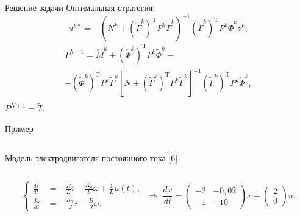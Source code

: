         \begin{frame}{Решение задачи}
                Оптимальная стратегия:
                $$
                        \boxed{
                                u^{k*} = -(N^k + (\tilde\Gamma^k)^{\mathrm{T}} P^{k}\tilde\Gamma^k)^{-1}(\tilde\Gamma^k)^{\mathrm{T}} P^{k} \tilde\Phi^k z^k,
                        }
                $$
                \begin{multline*}
                        P^{k-1} = \tilde M^k + (\tilde\Phi^k)^{\mathrm{T}}P^k\tilde\Phi^k
                        -\\- (\tilde\Phi^k)^{\mathrm{T}}P^k\tilde\Gamma^k[N
                        + (\tilde\Gamma^k)^{\mathrm{T}}P^k\tilde\Gamma^k]^{-1}(\tilde\Gamma^k)^{\mathrm{T}}P^k\tilde\Phi^k, \\
                \end{multline*}
                $
                        P^{N+1} = \tilde T.
                $
        \end{frame}
        \begin{frame}{Пример}
                \begin{columns}
                        \begin{column}{0.4\textwidth}
                                Модель электродвигателя постоянного тока [6]:
                        \end{column}
                        \begin{column}{0.6\textwidth}
                                
                        \end{column}
                \end{columns}
                $$
                        \left\{
                        \begin{aligned}
                        \frac {di}{dt}
                        &=
                        -\frac{R}{L}i
                        -
                        \frac{K_b}{L}\omega
                        +
                        \frac{1}{L}u(t),\\
                        \frac{d\omega}{dt}
                        &=
                        -\frac{K_T}{J}i
                        -
                        \frac{B}{J}\omega.
                        \end{aligned}
                        \right.
                        \;\Longrightarrow\;
                                \frac{dx}{dt}
                                =
                                \begin{pmatrix}
                        -2 & -0,\!02 \\
                        -1 & -10
                                \end{pmatrix}
                                x
                                +
                                \begin{pmatrix}
                        2 \\
                        0
                                \end{pmatrix}
                                u.
                $$
        \end{frame}
